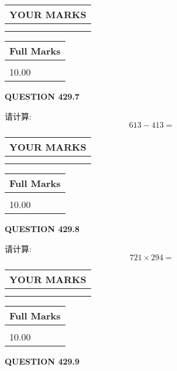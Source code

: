 \documentclass{ctexart}
\begin{document}
\noindent\begin{tabular}{|l|}
\hline
 YOUR MARKS  \\
\hline
 \\ 
 \\ 
\hline
\end{tabular}
\hspace{0.05in} \begin{tabular}{|l|}
\hline
 Full Marks  \\
\hline
 \\ 
10.00 \\
\hline
\end{tabular}
{\textbf{\Large{QUESTION
429.7 
}}}
  
  
 
请计算:
\begin{equation}
613 -   %
413 = \nonumber
\end{equation}
 

 

 
  
\vspace{0.2in}
  
\noindent\begin{tabular}{|l|}
\hline
 YOUR MARKS  \\
\hline
 \\ 
 \\ 
\hline
\end{tabular}
\hspace{0.05in} \begin{tabular}{|l|}
\hline
 Full Marks  \\
\hline
 \\ 
10.00 \\
\hline
\end{tabular}
{\textbf{\Large{QUESTION
429.8 
}}}
  
  
 
请计算:
\begin{equation}
721  \times    %
294 = \nonumber
\end{equation}
 

 

 
  
\vspace{0.2in}
  
\noindent\begin{tabular}{|l|}
\hline
 YOUR MARKS  \\
\hline
 \\ 
 \\ 
\hline
\end{tabular}
\hspace{0.05in} \begin{tabular}{|l|}
\hline
 Full Marks  \\
\hline
 \\ 
10.00 \\
\hline
\end{tabular}
{\textbf{\Large{QUESTION
429.9 
}}}
  
\end{document}
